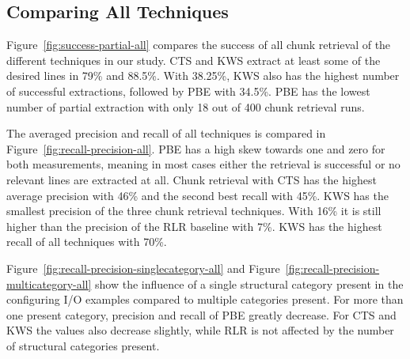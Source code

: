 \documentclass[\myrootdir/main.tex]{subfiles}
\begin{document}

\subsection{Comparing All Techniques}
Figure~\ref{fig:success-partial-all} compares the success of all chunk retrieval of the different techniques in our study.
CTS and KWS extract at least some of the desired lines in 79\% and 88.5\%.
With 38.25\%, KWS also has the highest number of successful extractions, followed by PBE with 34.5\%.
PBE has the lowest number of partial extraction with only 18 out of 400 chunk retrieval runs.

The averaged precision and recall of all techniques is compared in Figure~\ref{fig:recall-precision-all}.
PBE has a high skew towards one and zero for both measurements, meaning in most cases either the retrieval is successful or no relevant lines are extracted at all.
Chunk retrieval with CTS has the highest average precision with 46\% and the second best recall with 45\%.
KWS has the smallest precision of the three chunk retrieval techniques.
With 16\% it is still higher than the precision of the RLR baseline with 7\%.
KWS has the highest recall of all techniques with 70\%.

Figure~\ref{fig:recall-precision-singlecategory-all} and Figure~\ref{fig:recall-precision-multicategory-all} show the influence of a single structural category present in the configuring I/O examples compared to multiple categories present.
For more than one present category, precision and recall of PBE greatly decrease.
For CTS and KWS the values also decrease slightly, while RLR is not affected by the number of structural categories present.
\end{document}
